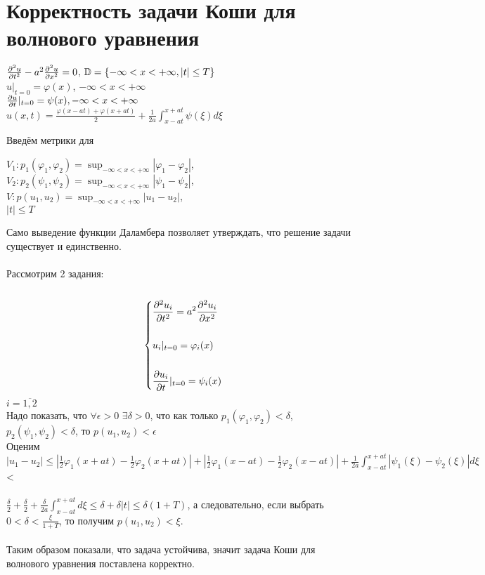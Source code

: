 \documentclass[../main.tex]{subfiles}
\begin{document}
\section{Корректность задачи Коши для волнового уравнения}
\begin{large}
    \begin{center}
        $\frac{\partial^2 u}{\partial t^2}-a^2\frac{\partial^2 u}{\partial x^2}=0$, $\mathbb{D}=\{ -\infty<x<+\infty, |t|\leq T\rbrace$\\
        $ $\\
        $ u|_{t=0} = \varphi(x)$, $-\infty<x<+\infty$\\ 
        $ $\\
        $\frac{\partial u}{\partial t}|_{t=0} = \psi(x),  -\infty<x<+\infty$\\
        $ $\\
        $u(x,t)=\frac{\varphi(x-at)+\varphi(x+at)}{2}+\frac{1}{2a}\int_{x-at}^{x+at}\psi(\xi)d\xi$
    \end{center}
\end{large}
Введём метрики для
\begin{center}
$V_1:p_1(\varphi_1,\varphi_2)=\sup_{-\infty<x<+\infty}|\varphi_1-\varphi_2|$,\\
$V_2:p_2(\psi_1,\psi_2)=\sup_{-\infty<x<+\infty}|\psi_1-\psi_2|$,\\
$V:p(u_1,u_2)=\sup_{-\infty<x<+\infty}|u_1-u_2|$,\\ $|t| \leq T$\\
\end{center}
Само выведение функции Даламбера позволяет утверждать, что решение задачи существует и единственно.\\\\
    Рассмотрим 2 задания:\\\\
$$\begin{dcases}
\frac{\partial^2 u_i}{\partial t^2}=a^2\frac{\partial^2 u_i}{\partial x^2}\\\\
     u_i|_{t=0}=\varphi_i(x)\\\\
     \frac{\partial u_i}{\partial t}|_{t=0}=\psi_i(x)
\end{dcases} $$ 
$i=\overline{1,2}$\\ 
Надо показать, что $\forall \epsilon > 0$  $\exists \delta > 0$,  что как только $p_1(\varphi_1, \varphi_2)<\delta$, $p_2(\psi_1, \psi_2)<\delta$, то $p(u_1, u_2)<\epsilon$\\
Оценим\\
$|u_1-u_2| \leq |\frac{1}{2}\varphi_1(x+at)-\frac{1}{2}\varphi_2(x+at)|+|\frac{1}{2}\varphi_1(x-at)-\frac{1}{2}\varphi_2(x-at)|+\frac{1}{2a}\int_{x-at}^{x+at}|\psi_1(\xi)-\psi_2(\xi)|d\xi$<\\\\$\frac{\delta}{2}+\frac{\delta}{2}+\frac{\delta}{2a}\int_{x-at}^{x+at}d\xi \leq \delta+\delta|t| \leq \delta(1+T)$, а следовательно, если выбрать  $0<\delta<\frac{\xi}{1+T}$, то получим $p(u_1, u_2)<\xi$.\\\\
Таким образом показали, что задача устойчива, значит задача Коши для волнового уравнения поставлена корректно.
\end{document}
